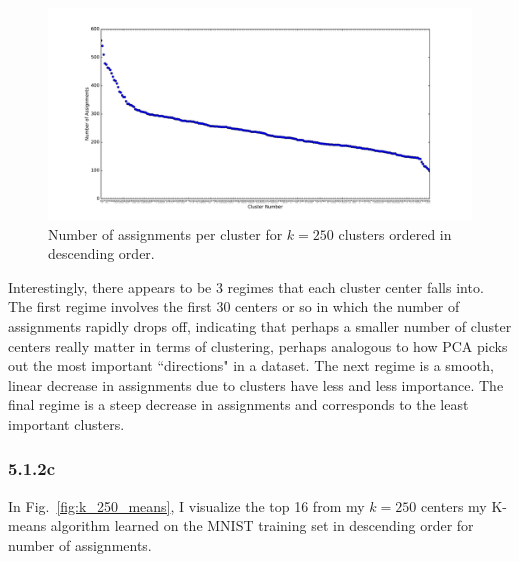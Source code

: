 \documentclass[12pt]{amsart}
\begin{document}
\begin{figure}[H]
	\includegraphics[width=\columnwidth]{k_250_num_assignments.pdf}
    \caption{Number of assignments per cluster for $k = 250$ clusters ordered in descending order.}
    \label{fig:k_250_num_assignments}
\end{figure}

Interestingly, there appears to be 3 regimes that each cluster center falls into.  The first regime involves the first 30 centers or so in which the number of assignments rapidly drops off, indicating that perhaps a smaller number of cluster centers really matter in terms of clustering, perhaps analogous to how PCA picks out the most important ``directions" in a dataset.  The next regime is a smooth, linear decrease in assignments due to clusters have less and less importance.  The final regime is a steep decrease in assignments and corresponds to the least important clusters.

\subsubsection*{5.1.2c}

In Fig.~\ref{fig:k_250_means}, I visualize the top 16 from my $k = 250$ centers my K-means algorithm learned on the MNIST training set in descending order for number of assignments.
\end{document}

